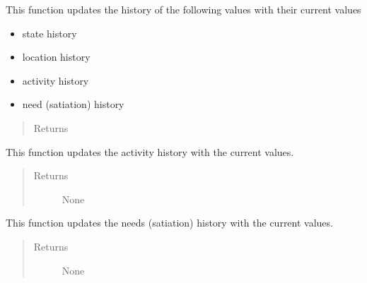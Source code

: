 \documentclass[letterpaper,10pt,english]{sphinxmanual}
\begin{document}
\begin{fulllineitems}
\begin{fulllineitems}
\end{fulllineitems}


\begin{fulllineitems}
\label{person:person.Person.update_history}
This function updates the history of the following values with their current values
\begin{itemize}
\item {} 
state history

\item {} 
location history

\item {} 
activity history

\item {} 
need (satiation) history

\end{itemize}
\begin{quote}\begin{description}
\item[{Returns}] \leavevmode


\end{description}\end{quote}

\end{fulllineitems}


\begin{fulllineitems}
\label{person:person.Person.update_history_activity}
This function updates the activity history with the current values.
\begin{quote}\begin{description}
\item[{Returns}] \leavevmode
None

\end{description}\end{quote}

\end{fulllineitems}


\begin{fulllineitems}
\label{person:person.Person.update_history_needs}
This function updates the needs (satiation) history with the current values.
\begin{quote}\begin{description}
\item[{Returns}] \leavevmode
None

\end{description}\end{quote}

\end{fulllineitems}


\end{fulllineitems}
\end{document}
